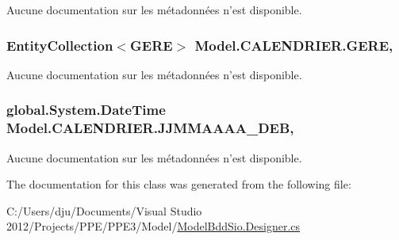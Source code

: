 Aucune documentation sur les métadonnées n'est disponible. 

\hypertarget{class_model_1_1_c_a_l_e_n_d_r_i_e_r_a0da6b33d11ac2daa1651c78a755662f1}{
\subsubsection[{G\-E\-R\-E}]{\setlength{\rightskip}{0pt plus 5cm}Entity\-Collection$<${\bf G\-E\-R\-E}$>$ Model.\-C\-A\-L\-E\-N\-D\-R\-I\-E\-R.\-G\-E\-R\-E\hspace{0.3cm}{\ttfamily [get]}, {\ttfamily [set]}}}\label{class_model_1_1_c_a_l_e_n_d_r_i_e_r_a0da6b33d11ac2daa1651c78a755662f1}


Aucune documentation sur les métadonnées n'est disponible. 

\hypertarget{class_model_1_1_c_a_l_e_n_d_r_i_e_r_ac108f24337afda1c3aae9ad11e06706f}{
\subsubsection[{J\-J\-M\-M\-A\-A\-A\-A\-\_\-\-D\-E\-B}]{\setlength{\rightskip}{0pt plus 5cm}global.\-System.\-Date\-Time Model.\-C\-A\-L\-E\-N\-D\-R\-I\-E\-R.\-J\-J\-M\-M\-A\-A\-A\-A\-\_\-\-D\-E\-B\hspace{0.3cm}{\ttfamily [get]}, {\ttfamily [set]}}}\label{class_model_1_1_c_a_l_e_n_d_r_i_e_r_ac108f24337afda1c3aae9ad11e06706f}


Aucune documentation sur les métadonnées n'est disponible. 



The documentation for this class was generated from the following file\-:\begin{DoxyCompactItemize}
\item 
C\-:/\-Users/dju/\-Documents/\-Visual Studio 2012/\-Projects/\-P\-P\-E/\-P\-P\-E3/\-Model/\hyperlink{_model_bdd_sio_8_designer_8cs}{Model\-Bdd\-Sio.\-Designer.\-cs}\end{DoxyCompactItemize}
